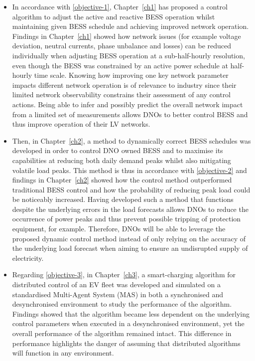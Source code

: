 \begin{itemize}
	\item
	In accordance with \ref{objective-1}, Chapter~\ref{ch1} has proposed a control algorithm to adjust the active and reactive BESS operation whilst maintaining given BESS schedule and achieving improved network operation.
	Findings in Chapter~\ref{ch1} showed how network issues (for example voltage deviation, neutral currents, phase unbalance and losses) can be reduced individually when adjusting BESS operation at a sub-half-hourly resolution, even though the BESS was constrained by an active power schedule at half-hourly time scale.
	Knowing how improving one key network parameter impacts different network operation is of relevance to industry since their limited network observability constrains their assessment of any control actions.
	Being able to infer and possibly predict the overall network impact from a limited set of measurements allows DNOs to better control BESS and thus improve operation of their LV networks.
	\item
	Then, in Chapter~\ref{ch2}, a method to dynamically correct BESS schedules was developed in order to control DNO owned BESS and to maximise its capabilities at reducing both daily demand peaks whilst also mitigating volatile load peaks.
	This method is thus in accordance with \ref{objective-2} and findings in Chapter~\ref{ch2} showed how the control method outperformed traditional BESS control and how the probability of reducing peak load could be noticeably increased.
	Having developed such a method that functions despite the underlying errors in the load forecasts allows DNOs to reduce the occurrence of power peaks and thus prevent possible tripping of protection equipment, for example.
	Therefore, DNOs will be able to leverage the proposed dynamic control method instead of only relying on the accuracy of the underlying load forecast when aiming to ensure an undisrupted supply of electricity.
	\item
	Regarding \ref{objective-3}, in Chapter~\ref{ch3}, a smart-charging algorithm for distributed control of an EV fleet was developed and simulated on a standardised Multi-Agent System (MAS) in both a synchronised and desynchronised environment to study the performance of the algorithm.
	Findings showed that the algorithm became less dependent on the underlying control parameters when executed in a desynchronised environment, yet the overall performance of the algorithm remained intact.
	This difference in performance highlights the danger of assuming that distributed algorithms will function in any environment.

\end{itemize}
